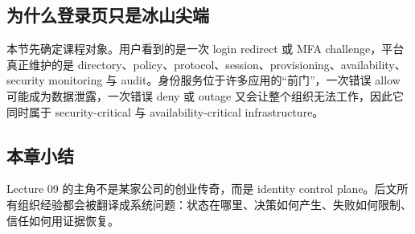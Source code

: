 \subsection{为什么登录页只是冰山尖端}

本节先确定课程对象。用户看到的是一次 login redirect 或 MFA challenge，平台真正维护的是 directory、policy、protocol、session、provisioning、availability、security monitoring 与 audit。身份服务位于许多应用的“前门”，一次错误 allow 可能成为数据泄露，一次错误 deny 或 outage 又会让整个组织无法工作，因此它同时属于 security-critical 与 availability-critical infrastructure。

\subsection{本章小结}

Lecture 09 的主角不是某家公司的创业传奇，而是 identity control plane。后文所有组织经验都会被翻译成系统问题：状态在哪里、决策如何产生、失败如何限制、信任如何用证据恢复。

